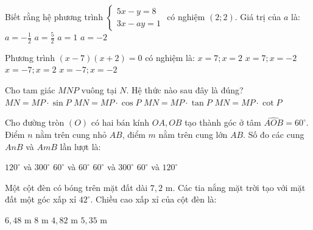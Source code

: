 \documentclass[12pt,a4paper]{article}
\begin{document}
\begin{ex}
Biết rằng hệ phương trình $\begin{cases} 5x - y = 8 \\ 3x - ay = 1 \end{cases}$ có nghiệm $(2; 2)$. Giá trị của $a$ là:
\choice
{$a = -\frac{1}{2}$}
{\True $a = \frac{5}{2}$}
{$a = 1$}
{$a = -2$}
\end{ex}

\begin{ex}
Phương trình $(x - 7)(x + 2) = 0$ có nghiệm là:
\choice
{$x = 7; x = 2$}
{\True $x = 7; x = -2$}
{$x = -7; x = 2$}
{$x = -7; x = -2$}
\end{ex}

\begin{ex}
Cho tam giác $MNP$ vuông tại $N$. Hệ thức nào sau đây là đúng?
\choice
{\True $MN = MP \cdot \sin P$}
{$MN = MP \cdot \cos P$}
{$MN = MP \cdot \tan P$}
{$MN = MP \cdot \cot P$}
\end{ex}

\begin{ex}
Cho đường tròn $(O)$ có hai bán kính $OA, OB$ tạo thành góc ở tâm $\widehat{AOB} = 60^\circ$. Điểm $n$ nằm trên cung nhỏ $AB$, điểm $m$ nằm trên cung lớn $AB$. Số đo các cung $AnB$ và $AmB$ lần lượt là:
\begin{center}
\end{center}
\choice
{$120^\circ$ và $300^\circ$}
{$60^\circ$ và $60^\circ$}
{\True $60^\circ$ và $300^\circ$}
{$60^\circ$ và $120^\circ$}
\end{ex}

\begin{ex}
Một cột đèn có bóng trên mặt đất dài $7{,}2\text{ m}$. Các tia nắng mặt trời tạo với mặt đất một góc xấp xỉ $42^\circ$. Chiều cao xấp xỉ của cột đèn là:
\begin{center}
\end{center}
\choice
{\True $6{,}48\text{ m}$}
{$8\text{ m}$}
{$4{,}82\text{ m}$}
{$5{,}35\text{ m}$}
\end{ex}
\end{document}
